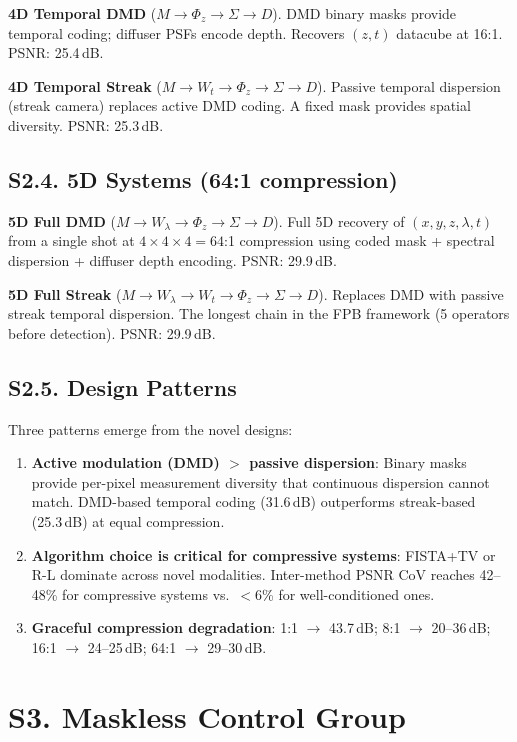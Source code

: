 \documentclass[11pt,a4paper]{article}
\begin{document}
\textbf{4D Temporal DMD} ($M \to \Phi_z \to \Sigma \to D$).
DMD binary masks provide temporal coding; diffuser PSFs encode depth.  Recovers $(z, t)$ datacube at 16:1.  PSNR: 25.4\,dB.

\textbf{4D Temporal Streak} ($M \to W_t \to \Phi_z \to \Sigma \to D$).
Passive temporal dispersion (streak camera) replaces active DMD coding.  A fixed mask provides spatial diversity.  PSNR: 25.3\,dB.

\subsection{S2.4. 5D Systems (64:1 compression)}

\textbf{5D Full DMD} ($M \to W_\lambda \to \Phi_z \to \Sigma \to D$).
Full 5D recovery of $(x, y, z, \lambda, t)$ from a single shot at $4 \times 4 \times 4 = 64$:1 compression using coded mask + spectral dispersion + diffuser depth encoding.  PSNR: 29.9\,dB.

\textbf{5D Full Streak} ($M \to W_\lambda \to W_t \to \Phi_z \to \Sigma \to D$).
Replaces DMD with passive streak temporal dispersion.  The longest chain in the FPB framework (5 operators before detection).  PSNR: 29.9\,dB.

\subsection{S2.5. Design Patterns}

Three patterns emerge from the novel designs:

\begin{enumerate}[nosep]
\item \textbf{Active modulation (DMD) $>$ passive dispersion}: Binary masks provide per-pixel measurement diversity that continuous dispersion cannot match.  DMD-based temporal coding (31.6\,dB) outperforms streak-based (25.3\,dB) at equal compression.
\item \textbf{Algorithm choice is critical for compressive systems}: FISTA+TV or R-L dominate across novel modalities.  Inter-method PSNR CoV reaches 42--48\% for compressive systems vs.\ $<$6\% for well-conditioned ones.
\item \textbf{Graceful compression degradation}: 1:1 $\to$ 43.7\,dB; 8:1 $\to$ 20--36\,dB; 16:1 $\to$ 24--25\,dB; 64:1 $\to$ 29--30\,dB.
\end{enumerate}

\section{S3. Maskless Control Group}
\end{document}
